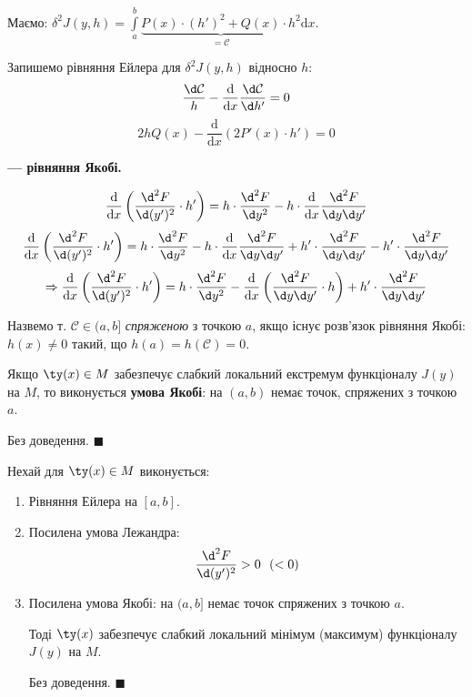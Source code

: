 Маємо: \( \delta^2 J(y, h) =  \int\limits_{a}^{b}{
\underbrace{P(x) \cdot (h')^2 + Q(x)\cdot h^2}_{= \mathcal{C}}
  \mathrm{d} x
} \). \par
Запишемо рівняння Ейлера для \(  \delta^2 J(y, h) \) відносно \( h \):
\[
 \frac{\d \mathcal{C}}{h} - \frac{\mathrm{d}}{\mathrm{d} x} \frac{\d \mathcal{C}}{\d h'} = 0
\]
\[
2 h Q(x) - \frac{\mathrm{d}}{\mathrm{d} x } \left( 2 P'(x) \cdot h' \right) = 0
\]
\begin{center}
   \textbf{ --- рівняння Якобі.}
\end{center}
\[
 \frac{\mathrm{d}}{\mathrm{d} x}  \left(  \frac{\d^2 F}{\d (y')^2} \cdot h' \right) = h \cdot
 \frac{\d^2 F}{\d y^2}  - h \cdot \frac{\mathrm{d}}{\mathrm{d} x} \frac{\d^2 F}{\d y \d y'}
\]
\[
\frac{\mathrm{d}}{\mathrm{d} x}  \left(  \frac{\d^2 F}{\d (y')^2} \cdot h' \right) = h \cdot
\frac{\d^2 F}{\d y^2}  - h \cdot \frac{\mathrm{d}}{\mathrm{d} x} \frac{\d^2 F}{\d y \d y'} + h' \cdot \frac{\d^2 F}{\d y \d y'} -  h' \cdot \frac{\d^2 F}{\d y \d y'}
\]
\[
 \Rightarrow \frac{\mathrm{d}}{\mathrm{d} x}   \left(  \frac{\d^2 F}{\d (y')^2} \cdot h' \right) =   h \cdot
 \frac{\d^2 F}{\d y^2}  -
 \frac{\mathrm{d}}{\mathrm{d} x} \left( \frac{\d^2 F}{\d y \d y'} \cdot h \right) +
 h' \cdot \frac{\d^2 F}{\d y \d y'}
\]
\begin{center}
\end{center}
\begin{defo}
 Назвемо т. \( \mathcal{C} \in (a,b] \) \textit{спряженою} з точкою \( a \), якщо
 існує розв'язок рівняння Якобі: \( h(x) \neq 0 \) такий, що \( h(a) = h(\mathcal{C}) = 0 \).
\end{defo}

\begin{boxteo}
 Якщо \( \ty (x) \in M \) забезпечує слабкий локальний екстремум функціоналу \( J(y) \) на
 \(  M \), то виконується \textbf{умова Якобі}: на \( (a,b) \) немає  точок, спряжених з точкою \( a \). \par
 Без доведення. \( \blacksquare \)
\end{boxteo}
\newpage
\begin{boxteo}
  Нехай для \( \ty(x) \in M \) виконується:
  \begin{enumerate}
    \item Рівняння Ейлера на \( [a,b] \).
    \item Посилена умова Лежандра:
    \[
     \frac{\d^2 F}{\d (y')^2} > 0 \ \ (< 0)
    \]
    \item Посилена умова Якобі: на \( (a,b] \) немає точок спряжених з точкою \( a \).\par
    Тоді \( \ty (x) \) забезпечує слабкий локальний мінімум (максимум) функціоналу \( J(y) \) на \( M \).\par
    Без доведення. \( \blacksquare \)
  \end{enumerate}
\end{boxteo}
